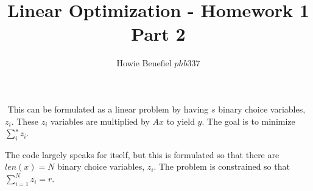 \documentclass[12pt]{article}
\newenvironment{problem}[2][Problem]{\begin{trivlist}
\item[\hskip \labelsep {\bfseries #1}\hskip \labelsep {\bfseries #2.}]}{\end{trivlist}}
\theoremstyle{definition}
\begin{document}

\title{Linear Optimization - Homework 1 Part 2}
\author{Howie Benefiel \(phb337\)}
\maketitle

\begin{problem}{2}
$ $ \newline
This can be formulated as a linear problem by having $s$ binary choice variables, $z_i$.
These $z_i$ variables are multiplied by $Ax$ to yield $y$.
The goal is to minimize $\sum_i^{s} z_i$.

\end{problem}

\begin{problem}{3}
The code largely speaks for itself, but this is formulated so that there are $len(x) = N$ binary choice variables, $z_i$.
The problem is constrained so that $\sum_{i=1}^N z_i=r$.
\end{problem}
\end{document}
